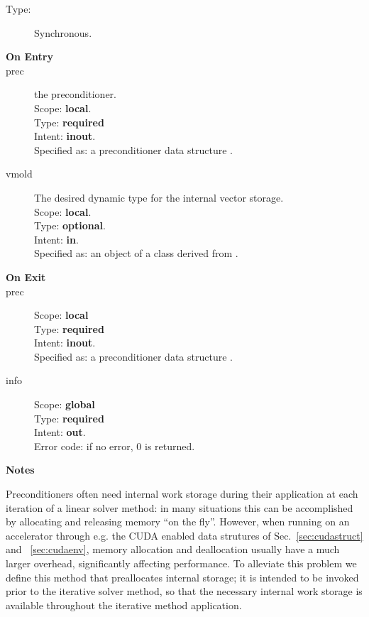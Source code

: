 \begin{description}
\item[Type:] Synchronous.
\item[\bf On Entry]
\item[prec] the preconditioner.\\
Scope: {\bf local}.\\
Type: {\bf required}\\
Intent: {\bf inout}.\\
Specified as: a preconditioner data structure \precdata.
\item[vmold] The desired dynamic type for the internal vector storage.\\
Scope: {\bf local}.\\
Type: {\bf optional}.\\
Intent: {\bf in}.\\
Specified as: an object of a class derived from \vbasedata. 
\item[\bf On Exit]

\item[prec] 
Scope: {\bf local} \\
Type: {\bf required}\\
Intent: {\bf inout}.\\
Specified as: a preconditioner data structure \precdata.
\item[info] 
Scope: {\bf global} \\
Type: {\bf required}\\
Intent: {\bf out}.\\
Error code: if no error, 0 is returned.
\end{description}
{\par\noindent\large\bfseries Notes}
Preconditioners often need internal work storage during their
application at each iteration of a linear solver method: in many
situations this can be  accomplished by allocating and releasing
memory ``on the fly''. However, when running on an accelerator through
e.g. the CUDA enabled data strutures of Sec.~\ref{sec:cudastruct} and
~\ref{sec:cudaenv},  memory allocation and deallocation usually have a
much larger overhead, significantly affecting performance. To
alleviate this problem we define this method that preallocates
internal storage; it is intended to be invoked prior to the iterative
solver method, so that the necessary internal work storage is
available throughout the iterative method application.

